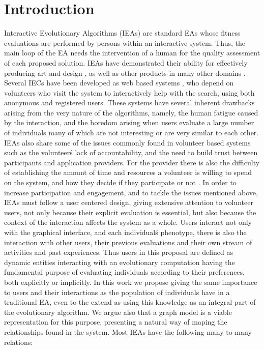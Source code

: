 \documentclass[conference]{IEEEtran}
\begin{document}
\section{Introduction}
Interactive Evolutionary Algorithms (IEAs) are standard EAs whose
fitness evaluations are performed by persons within an interactive 
system.  Thus, the main loop of the EA needs the intervention of a
human for the quality assessment of each proposed solution.
IEAs have demonstrated their ability for effectively
producing art and design \cite{Bentley:1999:intro,Sims:1991,todd:1992},
as well as other products in many other domains \cite{ie1}. 
Several IECs have been developed as web based systems \cite{picbreeder},
who depend on volunteers who visit the system to interactively help
with the search, using both anonymous and registered users.
These systems have several inherent drawbacks arising from the very nature of 
the algorithms, namely, the human fatigue caused by the interaction, and
the boredom arising when users evaluate a large number of individuals 
many of which are not interesting or are very similar to each other.
IEAs also share some of the issues commonly found in volunteer based systems
\cite{sarmenta2001volunteer,web:BOINC} such as the volunteer\'s lack of accountability,
and the need to build trust between participants and application providers. 
For the provider there is also the difficulty of establishing 
the amount of time and resources
a volunteer is willing to spend on the system, and how they decide if they
participate or not \cite{JJ:2016}. In order to increase participation and 
engagement, and to tackle the issues mentioned above,  
IEAs must follow a user centered design, giving extensive attention 
to volunteer users, not only because their
explicit evaluation is essential, but also because the context of the 
interaction affects the system as a whole. Users interact not only with the graphical
interface, and each individual\'s phenotype, there is also the interaction
with other users, their previous evaluations and their own stream of activities
and past experiences. Thus users in this proposal are defined as dynamic entities 
interacting with an evolutionary computation having the fundamental purpose 
of evaluating individuals according to their preferences,
both explicitly or implicitly. In this work we propose giving the same
importance to users and their interactions as the population of 
individuals have in a traditional EA, even to the extend as using this
knowledge as an integral part of the evolutionary algorithm. We argue also
that a graph model is a viable representation for this purpose,  
presenting a natural way of maping the relationships found in the system. 
Most IEAs have the following many-to-many relations:
\end{document}
